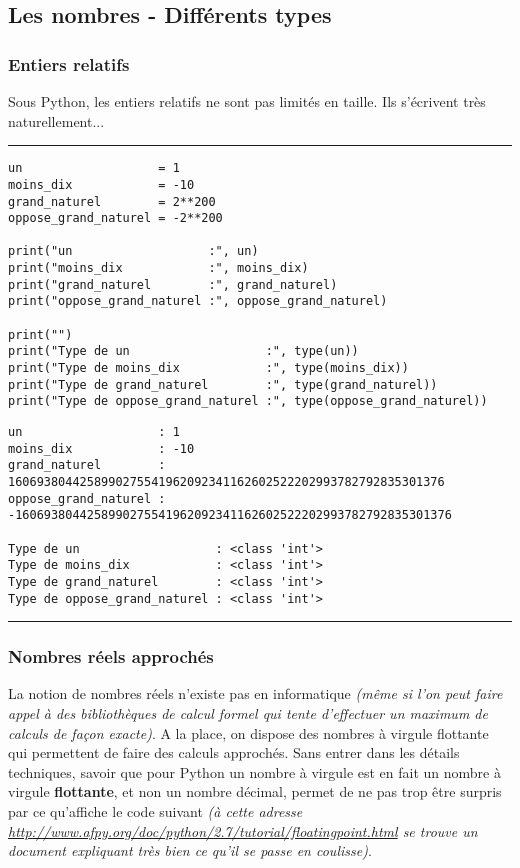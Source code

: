 \subsection{Les nombres - Différents types}

\subsubsection{Entiers relatifs}

Sous Python, les entiers relatifs ne sont pas limités en taille. Ils s'écrivent très naturellement...


\bigskip
{\hrule height .5mm}
\begin{verbatim}
un                   = 1
moins_dix            = -10
grand_naturel        = 2**200
oppose_grand_naturel = -2**200

print("un                   :", un)
print("moins_dix            :", moins_dix)
print("grand_naturel        :", grand_naturel)
print("oppose_grand_naturel :", oppose_grand_naturel)

print("")
print("Type de un                   :", type(un))
print("Type de moins_dix            :", type(moins_dix))
print("Type de grand_naturel        :", type(grand_naturel))
print("Type de oppose_grand_naturel :", type(oppose_grand_naturel))
\end{verbatim}
 \color{ForestGreen}
\vspace{-1.5em}
\begin{verbatim}
un                   : 1
moins_dix            : -10
grand_naturel        : 1606938044258990275541962092341162602522202993782792835301376
oppose_grand_naturel : -1606938044258990275541962092341162602522202993782792835301376

Type de un                   : <class 'int'>
Type de moins_dix            : <class 'int'>
Type de grand_naturel        : <class 'int'>
Type de oppose_grand_naturel : <class 'int'>
\end{verbatim} \color{Black}
{\hrule height .5mm}
\bigskip


\subsubsection{Nombres réels approchés}

La notion de nombres réels n'existe pas en informatique \textit{(même si l'on peut faire appel à des bibliothèques de calcul formel qui tente d'effectuer un maximum de calculs de façon exacte)}. A la place, on dispose des nombres à virgule flottante qui permettent de faire des calculs approchés. Sans entrer dans les détails techniques, savoir que pour Python un nombre à virgule est en fait un nombre à virgule \textbf{flottante}, et non un nombre décimal, permet de ne pas trop être surpris par ce qu'affiche le code suivant \textit{(à cette adresse \url{http://www.afpy.org/doc/python/2.7/tutorial/floatingpoint.html} se trouve un document expliquant très bien ce qu'il se passe en coulisse)}.


